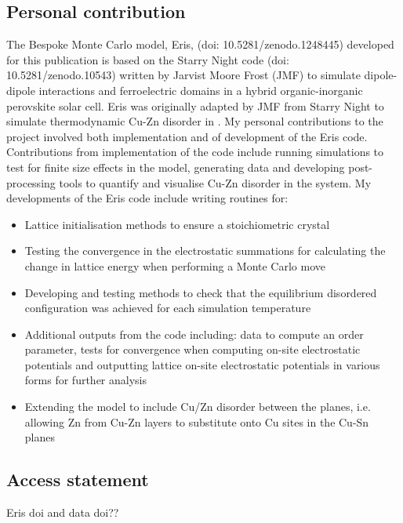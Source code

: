 \documentclass[11pt, twoside]{report}
\begin{document}
\subsection{Personal contribution}
The Bespoke Monte Carlo model, Eris, (doi: 10.5281/zenodo.1248445) developed for this publication is based on the Starry Night code (doi: 10.5281/zenodo.10543) written by Jarvist Moore Frost (JMF) to simulate dipole-dipole interactions and ferroelectric domains in a hybrid organic-inorganic perovskite solar cell. Eris was originally adapted by JMF from Starry Night to simulate thermodynamic Cu-Zn disorder in {\CZTS}. My personal contributions to the project involved both implementation and of development of the Eris code. Contributions from implementation of the code include running simulations to test for finite size effects in the model, generating data and developing post-processing tools to quantify and visualise Cu-Zn disorder in the system. My developments of the Eris code include writing routines for:
\begin{itemize}
    \item Lattice initialisation methods to ensure a stoichiometric {\CZTS} crystal
    \item Testing the convergence in the electrostatic summations for calculating the change in lattice energy when performing a Monte Carlo move
    \item Developing and testing methods to check that the equilibrium disordered configuration was achieved for each simulation temperature
    \item Additional outputs from the code including: data to compute an order parameter, tests for convergence when computing on-site electrostatic potentials and outputting lattice on-site electrostatic potentials in various forms for further analysis
    \item Extending the model to include Cu/Zn disorder between the planes, i.e. allowing Zn from Cu-Zn layers to substitute onto Cu sites in the Cu-Sn planes
\end{itemize}

\subsection{Access statement}
Eris doi and data doi??



\end{document}
